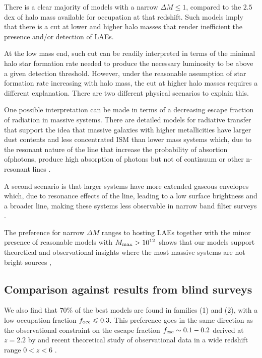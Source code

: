 \documentclass[usenatbib]{mn2e}
\newcommand{\ly}{{\ifmmode{{\rm Ly}\alpha}\else{Ly$\alpha$~}\fi}}
\newcommand{\hMsun}{{\ifmmode{h^{-1}{\rm
        {M_{\odot}}}}\else{$h^{-1}{\rm{M_{\odot}}}$}\fi}}
\begin{document}
There is a clear majority of models with a narrow $\Delta M\leq
1$, compared to the $2.5$dex of halo mass available for occupation at
that redshift. Such models imply that there is a cut at lower and higher halo
masses that render inefficient the presence and/or detection of LAEs.

At the low mass end, such cut can be readily interpreted in terms of the
minimal halo star formation rate needed to produce the necessary \ly 
luminosity to be above a given detection threshold.  However, under
the reasonable assumption of star formation rate increasing with halo
mass, the cut at higher halo masses requires a different
explanation. There are two different physical scenarios to explain
this. 

One possible interpretation can be made in terms of a decreasing escape
fraction of \ly radiation in massive systems. There are detailed models for
radiative transfer that support the idea that massive galaxies with
higher metallicities have larger dust contents and less concentrated
ISM than lower mass systems which, due to the resonant nature of the
\ly line that increase the probability of absortion  of\ly photons, produce
high absorption of \ly photons but not of continuum or
other n-resonant lines \citep{Laursen2009,ForeroRomero2011}.  

A second scenario is that larger systems have more extended gaseous
envelopes which, due to resonance effects of the \ly line, leading to
a low surface brightness and a broader line, making these systems less
observable in narrow band filter surveys \citep{Zheng2010}. 

The preference for narrow $\Delta M$ ranges to hosting LAEs together
with the minor presence of reasonable models with $M_{\rm max}>
10^{12}$\hMsun \  shows that our models support theoretical and observational
insights where the most massive systems are not bright \ly sources
\citep{ForeroRomero2012}, \citep{Shapley2003}

\subsection{Comparison against results from blind surveys}

We also find that $70\%$ of the best models are found in families (1)
and (2), with a low occupation fraction $f_{\rm occ}\leq 0.3$. This
preference goes in the same direction as the observational constraint
on the escape fraction $f_{\rm esc}\sim 0.1-0.2$ derived at $z=2.2$ by \cite{Hayes2010}
and recent theoretical study of observational data in a wide redshift
range $0<z<6$  \citep{Dijkstra2013}.  
\end{document}

